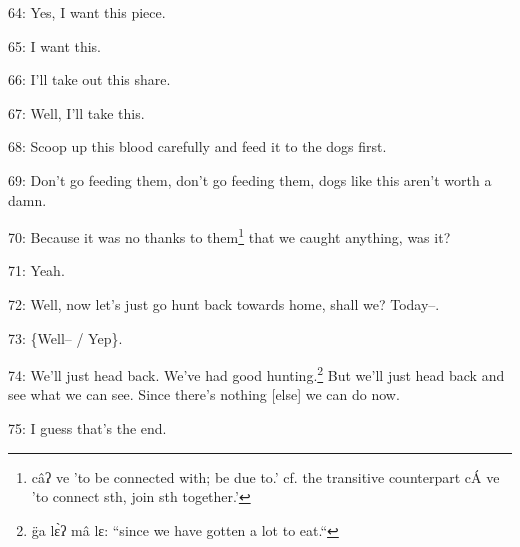64: Yes, I want this piece.

65: I want this.

66: I'll take out this share.

67: Well, I'll take this.

68: Scoop up this blood carefully and feed it to the dogs first.

69: Don't go feeding them, don't go feeding them, dogs like this aren't worth a
damn.

70: Because it was no thanks to them\footnote{câʔ ve 'to be connected with; be due to.' cf. the transitive counterpart cÁ ve 'to connect sth, join sth together.'} that we caught anything, was it?

71: Yeah.

72: Well, now let's just go hunt back towards home, shall we? Today--.

73: \{Well-- / Yep\}.

74: We'll just head back. We've had good hunting.\footnote{g̈a lɛ̀ʔ mâ lɛ: ``since we have gotten a lot to eat.``} But we'll just head back
and see what we can see. Since there's nothing [else] we can do now.

75: I guess that's the end.


